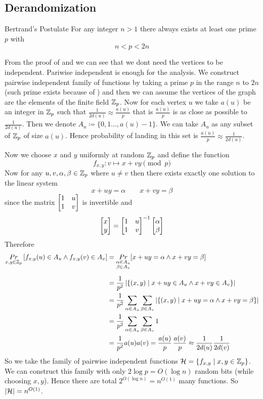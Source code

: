 \subsection{Derandomization}
\begin{theorem}{Bertrand's Postulate}\label{bertrand}
	For any integer $n>1$ there always exists at least one prime $p$ with $$n<p<2n$$
\end{theorem}

From the proof of  and  we can see that we dont need the vertices to be independent. Pariwise independent is enough for the analysis. We construct pairwise independent family of functions by taking a prime $p$ in the range $n$ to $2n$ (such prime exists because of ) and then we can assume the vertices of the graph are the elements of the finite field $\mathbb{Z}_p$. Now for each vertex $u$ we take $a(u)$ be an integer in $\mathbb{Z}_p$ such that  $\frac1{2d(u)}\approx  \frac{a(u)}{p}$ that is $\frac{a(u)}{p}$ is as close as possible to $\frac1{2d(u)}$. Then we denote $A_u\coloneqq \{0,1\dots, a(u)-1\}$. We can take $A_u$ as any subset of $\mathbb{Z}_p$ of size $a(u)$.  Hence probability of landing in this set is $\frac{a(u)}{p}\approx \frac1{2d(u)}$.

Now we choose $x$ and $y$ uniformly at random $\mathbb{Z}_p$ and define the function $$f_{x,y}:v\mapsto x+vy\pmod{p}$$Now for any $u,v,\alpha,\beta\in \mathbb{Z}_p$ where $u\neq v$ then there exists exactly one solution to the linear system $$x+uy=\alpha \qquad x+vy=\beta$$ since the matrix $\left[\begin{matrix}1& u\\ 1& v\end{matrix}\right]$ is invertible and $$\left[\begin{matrix}x\\ y\end{matrix}\right] =\left[\begin{matrix}1&u\\ 1&v\end{matrix}\right]^{-1}\left[\begin{matrix}\alpha\\ \beta\end{matrix}\right]$$Therefore\begin{align*}
	\underset{x,y\in \mathbb{Z}_p}{Pr}\left[f_{x,y}(u)\in A_u\wedge f_{x,y}(v)\in A_v\right] & = \underset{\substack{\alpha\in A_u\\ \beta\in A_v}}{Pr}[x+uy=\alpha \wedge x+vy=\beta]\\[2mm]
	& = \frac1{p^2} \left| \{(x,y)\mid x+uy\in A_u\wedge x+vy\in A_v \} \right|\\
	& = \frac1{p^2} \sum_{\alpha\in A_u}\sum_{\beta\in A_v} |\{(x,y)\mid x+uy=\alpha \wedge x+vy=\beta\}|\\
	& = \frac1{p^2} \sum_{\alpha\in A_u}\sum_{\beta\in A_v}1\\
	& = \frac1{p^2}a(u)a(v)=\frac{a(u)}{p}\, \frac{a(v)}{p}\approx \frac1{2d(u)}\frac1{2d(v)}
\end{align*}
So we take the family of pairwise independent functions $\mathcal{H}=\{ f_{x,y}\mid x,y\in \mathbb{Z}_p\}$. We can construct this family with only $2\log p=O(\log n)$ random bits (while choosing $x,y$). Hence there are total $2^{O(\log n)}=n^{O(1)}$ many functions. So $|\mathcal{H}|=n^{O(1)}$. 

